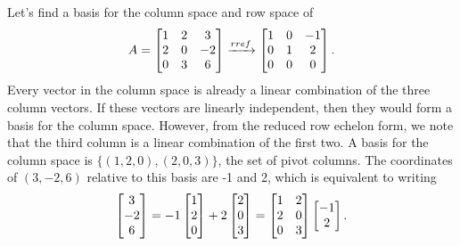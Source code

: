 \begin{example}\label{colspace1ex}
Let's find a basis for the column space and row space of 
$$A=\begin{bmatrix}
\begin{matrix} 1\\2\\0 \end{matrix}
&\begin{matrix} 2\\0\\3 \end{matrix}
&\begin{matrix} 3\\-2\\6 \end{matrix}
\end{bmatrix}
\xrightarrow{rref}
\begin{bmatrix}
\begin{matrix} 1\\0\\0 \end{matrix}
&\begin{matrix} 0\\1\\0 \end{matrix}
&\begin{matrix} -1\\2\\0 \end{matrix}
\end{bmatrix}.
$$
Every vector in the column space is already a linear combination of the three column vectors.  If these vectors are linearly independent, then they would form a basis for the column space.  However, from the reduced row echelon form, we note that the third column is a linear combination of the first two. A basis for the column space is  $\{(1,2,0),(2,0,3)\}$, the set of pivot columns. 
The coordinates of $(3,-2,6)$ relative to this basis are -1 and 2, which is equivalent to writing
 $$\begin{bmatrix}3\\-2\\6\end{bmatrix}
=-1\begin{bmatrix}1\\2\\0\end{bmatrix}+2\begin{bmatrix}2\\0\\3\end{bmatrix} 
=\begin{bmatrix}\begin{matrix} 1\\2\\0 \end{matrix}&\begin{matrix} 2\\0\\3 \end{matrix}\end{bmatrix}\begin{bmatrix}-1\\2\end{bmatrix} .$$ 
\marginpar{
}
\end{example}
